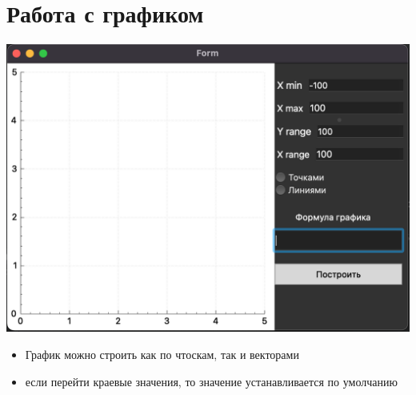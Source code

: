 \documentclass[a4paper,12pt]{article}
\begin{document}
	\section{Работа с графиком}
	\includegraphics[scale = 0.5]{graph}
	
	\begin{itemize}
		
		\item График можно строить как по чтоскам, так и векторами
		
		\item если перейти краевые значения, то значение устанавливается по умолчанию 
	\end{itemize}
	
\end{document}
